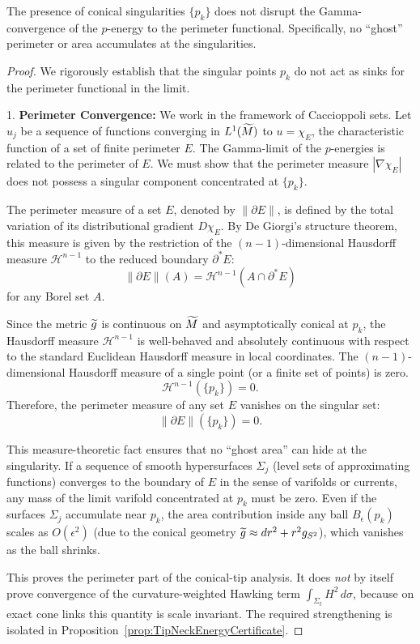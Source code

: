 \begin{lemma}\label{lem:GammaConvergenceConical}
The presence of conical singularities $\{p_k\}$ does not disrupt the
Gamma-convergence of the $p$-energy to the perimeter functional.  Specifically,
no ``ghost'' perimeter or area accumulates at the singularities.
\end{lemma}
\begin{proof}
We rigorously establish that the singular points $p_k$ do not act as sinks for
the perimeter functional in the limit.

1. \textbf{Perimeter Convergence:} We work in the framework of Caccioppoli sets.
Let $u_j$ be a sequence of functions converging in $L^1(\widetilde{M})$ to $u = \chi_E$, the characteristic function of a set of finite perimeter $E$. The Gamma-limit of the $p$-energies is related to the perimeter of $E$. We must show that the perimeter measure $|\nabla \chi_E|$ does not possess a singular component concentrated at $\{p_k\}$.

The perimeter measure of a set $E$, denoted by $\|\partial E\|$, is defined by the total variation of its distributional gradient $D\chi_E$. By De Giorgi's structure theorem, this measure is given by the restriction of the $(n-1)$-dimensional Hausdorff measure $\mathcal{H}^{n-1}$ to the reduced boundary $\partial^* E$:
\[ \|\partial E\|(A) = \mathcal{H}^{n-1}(A \cap \partial^* E) \]
for any Borel set $A$.

Since the metric $\widetilde{g}$ is continuous on $\widetilde{M}$ and asymptotically conical at $p_k$, the Hausdorff measure $\mathcal{H}^{n-1}$ is well-behaved and absolutely continuous with respect to the standard Euclidean Hausdorff measure in local coordinates.
The $(n-1)$-dimensional Hausdorff measure of a single point (or a finite set of points) is zero.
\[ \mathcal{H}^{n-1}(\{p_k\}) = 0. \]
Therefore, the perimeter measure of any set $E$ vanishes on the singular set:
\[ \|\partial E\|(\{p_k\}) = 0. \]

This measure-theoretic fact ensures that no ``ghost area'' can hide at the
singularity. If a sequence of smooth hypersurfaces $\Sigma_j$ (level sets of
approximating functions) converges to the boundary of $E$ in the sense of
varifolds or currents, any mass of the limit varifold concentrated at $p_k$
must be zero. Even if the surfaces $\Sigma_j$ accumulate near $p_k$, the area
contribution inside any ball $B_\epsilon(p_k)$ scales as $O(\epsilon^2)$ (due
to the conical geometry $\widetilde{g} \approx dr^2 + r^2 g_{S^2}$), which vanishes as
the ball shrinks.

This proves the perimeter part of the conical-tip analysis.  It does
\emph{not} by itself prove convergence of the curvature-weighted Hawking term
$\int_{\Sigma_t}H^2\,d\sigma$, because on exact cone links this quantity is
scale invariant.  The required strengthening is isolated in
Proposition~\ref{prop:TipNeckEnergyCertificate}.
\end{proof}

